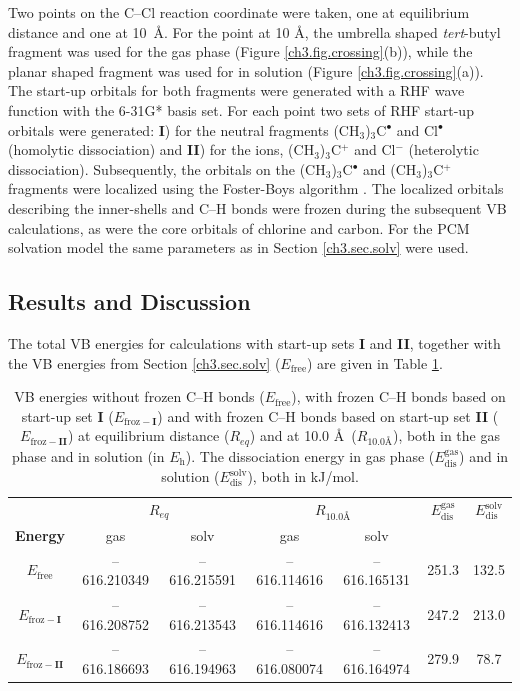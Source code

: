 Two points on the C--Cl reaction coordinate were taken, one at equilibrium distance and one at \mbox{10 \AA}. For the point at 10 \AA, the umbrella shaped \textit{tert}-butyl fragment was used for the gas phase (Figure \ref{ch3.fig.crossing}(b)), while the planar shaped fragment was used for in solution (Figure \ref{ch3.fig.crossing}(a)). The start-up orbitals for both fragments were generated with a RHF wave function with the 6-31G* basis set. For each point two sets of RHF start-up orbitals were generated: \textbf{I}) for the neutral fragments (CH$_3$)$_3$C$^\bullet$ and Cl$^\bullet$ (homolytic dissociation) and \textbf{II}) for the ions, (CH$_3$)$_3$C$^{+}$ and Cl$^{-}$ (heterolytic dissociation). Subsequently, the orbitals on the (CH$_3$)$_3$C$^\bullet$ and (CH$_3$)$_3$C$^{+}$ fragments were localized using the Foster-Boys algorithm \cite{foster}. The localized orbitals describing the inner-shells and C--H bonds were frozen during the subsequent VB calculations, as were the core orbitals of chlorine and carbon. For the PCM solvation model the same parameters as in Section \ref{ch3.sec.solv} were used.

\subsection{\label{ch3.sec.res.freez}Results and Discussion}

The total VB energies for calculations with start-up sets \textbf{I} and \textbf{II}, together with the VB energies from Section \ref{ch3.sec.solv} ($E_\mathrm{free}$) are given in Table \ref{ch3.tab.frozen}. 
\begin{table}[htp]
\center
\caption{VB energies without frozen C--H bonds ($E_\mathrm{free}$), with frozen C--H bonds based on
start-up set \textbf{I} ($E_\mathrm{froz-\textbf{I}}$) and with frozen C--H bonds based on start-up set \textbf{II}
($E_\mathrm{froz-\textbf{II}}$) at equilibrium distance ($R_{eq}$) and at 10.0 \AA\ ($R_{10.0 \text{\AA}}$),
both in the gas phase and in solution (in $E_\mathrm{h}$). The dissociation energy in gas phase ($E_\mathrm{dis}^\mathrm{gas}$) and in solution ($E_\mathrm{dis}^\mathrm{solv}$), both in kJ/mol.}
\center
\begin{tabular}{|c|cc|cc|c|c|}
\hline
&\multicolumn{2}{c|}{$R_{eq}$}&\multicolumn{2}{c|}{$R_{10.0 \text{\AA}}$} & $E_\mathrm{dis}^\mathrm{gas}$ & $E_\mathrm{dis}^\mathrm{solv}$ \\
\textbf{Energy} & gas & solv & gas & solv &  & \\
\hline
$E_\mathrm{free}$ & {--616.210349} & {--616.215591} & {--616.114616} & {--616.165131} & 251.3 & 132.5 \\
$E_\mathrm{froz-\textbf{I}}$& {--616.208752} & {--616.213543} & {--616.114616} & {--616.132413} & 247.2 &  213.0 \\
$E_\mathrm{froz-\textbf{II}}$& {--616.186693} & {--616.194963} & {--616.080074} & {--616.164974} & 279.9 & 78.7\\
\hline
\end{tabular}
\label{ch3.tab.frozen}
\end{table}

